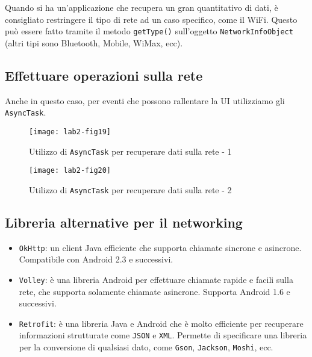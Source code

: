 Quando si ha un'applicazione che recupera un gran quantitativo di dati, è consigliato restringere il tipo di rete ad un caso specifico, come il WiFi. Questo può essere fatto tramite il metodo \texttt{getType()} sull'oggetto \texttt{NetworkInfoObject} (altri tipi sono Bluetooth, Mobile, WiMax, ecc).

\subsection{Effettuare operazioni sulla rete}

Anche in questo caso, per eventi che possono rallentare la UI utilizziamo gli \texttt{AsyncTask}.

\begin{figure}[htbp]
	\centering
	\texttt{[image: lab2-fig19]}
	\caption[AsyncTask sulla rete - 1]{Utilizzo di \texttt{AsyncTask} per recuperare dati sulla rete - 1}
	\label{img:lab2-fig19}
\end{figure}

\begin{figure}[htbp]
	\centering
	\texttt{[image: lab2-fig20]}
	\caption[AsyncTask sulla rete - 2]{Utilizzo di \texttt{AsyncTask} per recuperare dati sulla rete - 2}
	\label{img:lab2-fig20}
\end{figure}

\subsection{Libreria alternative per il networking}

\begin{itemize}
\item \texttt{OkHttp}: un client Java efficiente che supporta chiamate sincrone e asincrone. Compatibile con Android 2.3 e successivi.
\item \texttt{Volley}: è una libreria Android per effettuare chiamate rapide e facili sulla rete, che supporta solamente chiamate asincrone. Supporta Android 1.6 e successivi.
\item \texttt{Retrofit}: è una libreria Java e Android che è molto efficiente per recuperare informazioni strutturate come \texttt{JSON} e \texttt{XML}. Permette di specificare una libreria per la conversione di qualsiasi dato, come \texttt{Gson}, \texttt{Jackson}, \texttt{Moshi}, ecc.
\end{itemize}
